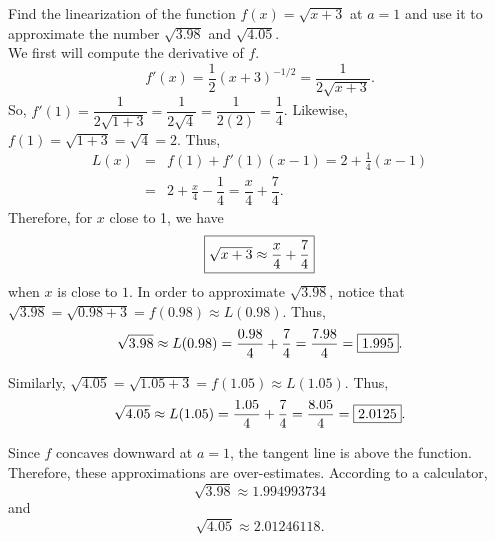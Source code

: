 \documentclass{book}
\begin{document}
\begin{Exam} Find the linearization of the function $f(x) = \sqrt{x+3}$ at $a=1$ and use it to approximate the number $\sqrt{3.98}$ and $\sqrt{4.05}$.\\

We first will compute the derivative of $f$. \[f'(x) = \dfrac{1}{2}(x+3)^{-1/2} = \dfrac{1}{2\sqrt{x+3}}.\] So, $f'(1) = \dfrac{1}{2\sqrt{1+3}} = \dfrac{1}{2\sqrt{4}} = \dfrac{1}{2(2)} = \dfrac{1}{4}$. Likewise, $f(1) = \sqrt{1+3} = \sqrt{4} = 2$. Thus, 
\begin{eqnarray*}
L(x) &=& f(1) + f'(1)(x-1) = 2 + \frac{1}{4}(x-1)\\
&=& 2 + \frac{x}{4} - \dfrac{1}{4}  = \dfrac{x}{4} + \dfrac{7}{4}.
\end{eqnarray*} Therefore, for $x$ close to 1, we have \[\fbox{$\sqrt{x+3} \approx \dfrac{x}{4}+\dfrac{7}{4}$}\] when $x$ is close to $1$. In order to approximate $\sqrt{3.98}$, notice that $\sqrt{3.98} = \sqrt{0.98 + 3} = f(0.98) \approx L(0.98)$. Thus, 
\[ \sqrt{3.98} \approx L(0.98) = \dfrac{0.98}{4} + \dfrac{7}{4} = \dfrac{7.98}{4} = \fbox{$1.995$}.\]\vs

\noindent Similarly, $\sqrt{4.05} = \sqrt{1.05 + 3} = f(1.05) \approx L(1.05)$. Thus, 
\[\sqrt{4.05} \approx L(1.05) = \dfrac{1.05}{4} + \dfrac{7}{4} = \dfrac{8.05}{4} = \fbox{$2.0125$}.\]

Since $f$ concaves downward at $a=1$, the tangent line is above the function. Therefore, these approximations are over-estimates. According to a calculator, \[\sqrt{3.98} \approx 1.994993734\]and\[ \sqrt{4.05} \approx 2.01246118. \]
\end{Exam}\vs

%
\end{document}
